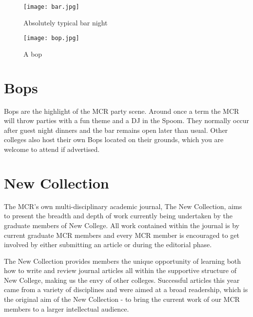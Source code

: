 \begin{figure}[htbp]
\centering
		\begin{minipage}{0.45\textwidth}
				\centering
				\texttt{[image: bar.jpg]}
				\caption[]{Absolutely typical bar night}
				\label{fig:bar}
        \end{minipage}%
        \quad
        \begin{minipage}{0.45\textwidth}
				\centering
				\texttt{[image: bop.jpg]}
				\caption[]{A bop}
				\label{fig:bop}
        \end{minipage}%
\end{figure}

\section{Bops}
Bops are the highlight of the MCR party scene. Around once a term the MCR will
throw parties with a fun theme and a DJ in the Spoom. They normally occur after guest night dinners and the bar remains open later than usual. Other colleges also host their own Bops located on their grounds, which you are welcome to attend if advertised. 

\section{New Collection}
The MCR's own multi-disciplinary academic journal, The New Collection, aims to present the breadth and depth of work currently being undertaken by the graduate members of New College. All work contained within the journal is by current graduate MCR members and every MCR member is encouraged to get involved by either submitting an article or during the editorial phase.

The New Collection provides members the unique opportunity of learning both how to write and review journal articles all within the supportive structure of New College, making us the envy of other colleges. Successful articles this year came from a variety of disciplines and were aimed at a broad readership, which is the original aim of the New Collection - to bring the current work of our MCR members to a larger intellectual audience.

